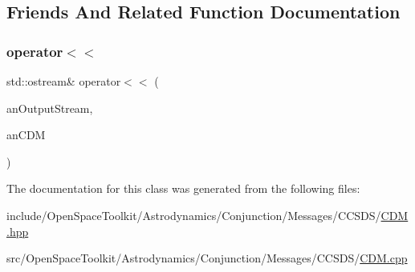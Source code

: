\subsection{Friends And Related Function Documentation}
\mbox{\label{classostk_1_1astro_1_1conjunction_1_1messages_1_1ccsds_1_1_c_d_m_ab7d7c6540081780b8224959e4bf0532e}} 
\subsubsection{\texorpdfstring{operator$<$$<$}{operator<<}}
{\footnotesize\ttfamily std\+::ostream\& operator$<$$<$ (\begin{DoxyParamCaption}\item[{std\+::ostream \&}]{an\+Output\+Stream,  }\item[{const \hyperlink{classostk_1_1astro_1_1conjunction_1_1messages_1_1ccsds_1_1_c_d_m}{C\+DM} \&}]{an\+C\+DM }\end{DoxyParamCaption})\hspace{0.3cm}{\ttfamily [friend]}}



The documentation for this class was generated from the following files\+:\begin{DoxyCompactItemize}
\item 
include/\+Open\+Space\+Toolkit/\+Astrodynamics/\+Conjunction/\+Messages/\+C\+C\+S\+D\+S/\hyperlink{_c_d_m_8hpp}{C\+D\+M.\+hpp}\item 
src/\+Open\+Space\+Toolkit/\+Astrodynamics/\+Conjunction/\+Messages/\+C\+C\+S\+D\+S/\hyperlink{_c_d_m_8cpp}{C\+D\+M.\+cpp}\end{DoxyCompactItemize}
